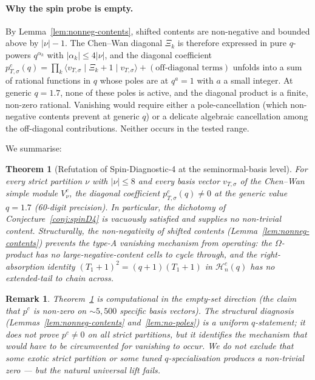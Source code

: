 \documentclass[11pt]{article}
\newtheorem{theorem}{Theorem}
\newtheorem*{remark}{Remark}
\newcommand{\HC}{\mathcal{H}^{c}_{n}(q)}
\newcommand{\Om}{\Omega}
\newcommand{\Xih}{\Xi}
\begin{document}
\paragraph{Why the spin probe is empty.}
By Lemma~\ref{lem:nonneg-contents}, shifted contents are non-negative and
bounded above by $|\nu| - 1$. The Chen--Wan diagonal $\Xih_k$ is therefore
expressed in pure $q$-powers $q^{\alpha_k}$ with $|\alpha_k| \le 4|\nu|$,
and the diagonal coefficient
$p^{c}_{T,\sigma}(q)
= \prod_{k} \langle v_{T,\sigma} \mid \Xih_k + 1 \mid v_{T,\sigma} \rangle
+ (\text{off-diagonal terms})$
unfolds into a sum of rational functions in $q$ whose poles are at $q^{a} = 1$
with $a$ a small integer. At generic $q = 1.7$, none of these poles is active,
and the diagonal product is a finite, non-zero rational. Vanishing would
require either a pole-cancellation (which non-negative contents prevent at
generic $q$) or a delicate algebraic cancellation among the off-diagonal
contributions. Neither occurs in the tested range.

We summarise:

\begin{theorem}[Refutation of Spin-Diagnostic-4 at the seminormal-basis level]
\label{thm:refutation}
For every strict partition $\nu$ with $|\nu| \le 8$ and every basis vector
$v_{T,\sigma}$ of the Chen--Wan simple module $V^{c}_{\nu}$, the diagonal
coefficient $p^{c}_{T,\sigma}(q) \ne 0$ at the generic value $q = 1.7$
(60-digit precision). In particular, the dichotomy of
Conjecture~\ref{conj:spinD4} is vacuously satisfied and supplies no
non-trivial content. Structurally, the non-negativity of shifted contents
(Lemma~\ref{lem:nonneg-contents}) prevents the type-A vanishing mechanism
from operating: the $\Om$-product has no large-negative-content cells to
cycle through, and the right-absorption identity $(T_1+1)^{2}=(q+1)(T_1+1)$
in $\HC$ has no extended-tail to chain across.
\end{theorem}

\begin{remark}
Theorem~\ref{thm:refutation} is computational in the empty-set direction
(the claim that $p^{c}$ is non-zero on $\sim 5{,}500$ specific basis
vectors). The structural diagnosis (Lemmas~\ref{lem:nonneg-contents}
and~\ref{lem:no-poles}) is a uniform $q$-statement; it does not prove
$p^{c} \ne 0$ on \emph{all} strict partitions, but it identifies the
mechanism that would have to be circumvented for vanishing to occur. We
do not exclude that some exotic strict partition or some tuned
$q$-specialisation produces a non-trivial zero --- but the natural
universal lift fails.
\end{remark}
\end{document}
